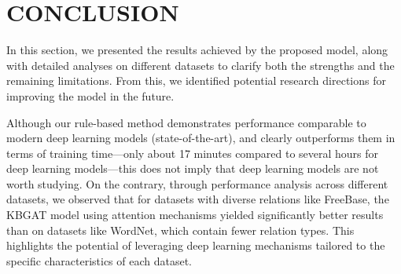 \chapter{CONCLUSION}
\label{chap:Conclusion}

%


In this section, we presented the results achieved by the proposed model, along with detailed analyses on different datasets to clarify both the strengths and the remaining limitations. From this, we identified potential research directions for improving the model in the future.

Although our rule-based method demonstrates performance comparable to modern deep learning models (state-of-the-art), and clearly outperforms them in terms of training time—only about 17 minutes compared to several hours for deep learning models—this does not imply that deep learning models are not worth studying. On the contrary, through performance analysis across different datasets, we observed that for datasets with diverse relations like FreeBase, the KBGAT model using attention mechanisms yielded significantly better results than on datasets like WordNet, which contain fewer relation types. This highlights the potential of leveraging deep learning mechanisms tailored to the specific characteristics of each dataset.

